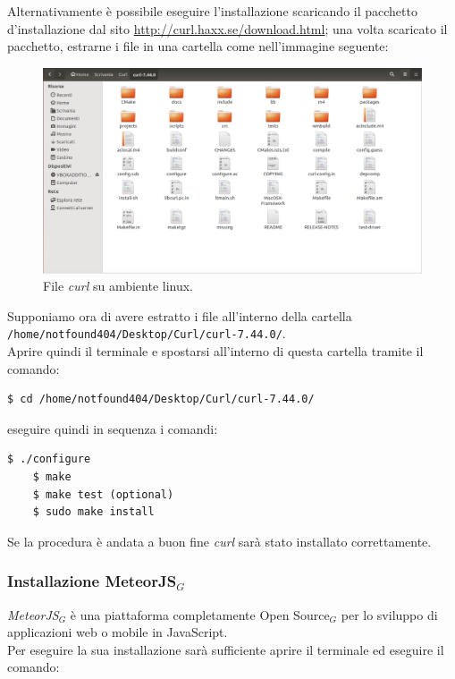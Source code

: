 \noindent Alternativamente è possibile eseguire l'installazione scaricando il pacchetto d'installazione dal sito \href{http://curl.haxx.se/download.html}{http://curl.haxx.se/download.html}; una volta scaricato il pacchetto, estrarne i file in una cartella come nell'immagine seguente:

\begin{figure}[h]
\begin{center}
\includegraphics[scale=0.3]{img/curl_files_linux.png}
\caption{File \emph{curl} su ambiente linux.}
\end{center}
\end{figure}

\newpage
\noindent Supponiamo ora di avere estratto i file all'interno della cartella \\
\verb+/home/notfound404/Desktop/Curl/curl-7.44.0/+.\\
Aprire quindi il terminale e spostarsi all'interno di questa cartella tramite il comando:

\begin{lstlisting}[style=DOS]
	$ cd /home/notfound404/Desktop/Curl/curl-7.44.0/
\end{lstlisting}

\noindent eseguire quindi in sequenza i comandi:

\begin{lstlisting}[style=DOS]
	$ ./configure
	$ make
	$ make test (optional)
	$ sudo make install
\end{lstlisting}
Se la procedura è andata a buon fine \emph{curl} sarà stato installato correttamente.

\subsubsection{Installazione MeteorJS$_G$}
\emph{MeteorJS$_G$} è una piattaforma completamente Open Source$_G$ per lo sviluppo di applicazioni web o mobile in JavaScript.\\
Per eseguire la sua installazione sarà sufficiente aprire il terminale ed eseguire il comando:

